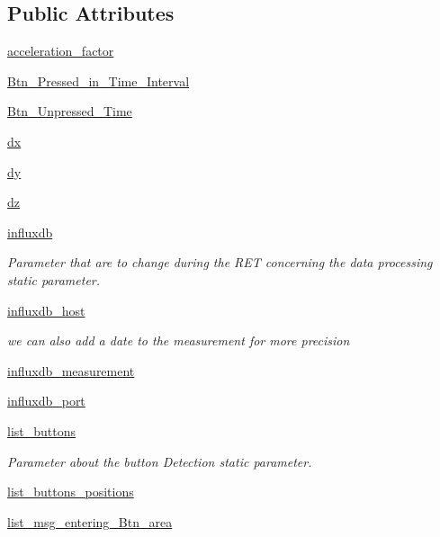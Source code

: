 \subsection*{Public Attributes}
\begin{DoxyCompactItemize}
\item 
\hyperlink{a00037_abd224cfc80b136898df89af7812fa8d5}{acceleration\+\_\+factor}
\item 
\hyperlink{a00037_a73222c92f422e37740aa524320dd3b66}{Btn\+\_\+\+Pressed\+\_\+in\+\_\+\+Time\+\_\+\+Interval}
\item 
\hyperlink{a00037_a7863230eddd33d64211a89a31cecb827}{Btn\+\_\+\+Unpressed\+\_\+\+Time}
\item 
\hyperlink{a00037_aacddc911cdfe5cd5ec97b084754542d4}{dx}
\item 
\hyperlink{a00037_a22b1a06ae09d552a5ca668a07885ebf1}{dy}
\item 
\hyperlink{a00037_a71f0caccd6959b358543ee9cdc9b9c3e}{dz}
\item 
\hyperlink{a00037_a034f595b48aad7217bd228d3620eaca8}{influxdb}
\begin{DoxyCompactList}\small\item\em Parameter that are to change during the R\+ET concerning the data processing static parameter. \end{DoxyCompactList}\item 
\hyperlink{a00037_a2c910a8a000ce837b18cf2959297dcce}{influxdb\+\_\+host}
\begin{DoxyCompactList}\small\item\em we can also add a date to the measurement for more precision \end{DoxyCompactList}\item 
\hyperlink{a00037_a2951333e048b79a878571eafd1eee541}{influxdb\+\_\+measurement}
\item 
\hyperlink{a00037_a0d892e15d9fa78818d4495560d962ec2}{influxdb\+\_\+port}
\item 
\hyperlink{a00037_a50ea04db981a8afa82086a60a58ae466}{list\+\_\+buttons}
\begin{DoxyCompactList}\small\item\em Parameter about the button Detection static parameter. \end{DoxyCompactList}\item 
\hyperlink{a00037_ae07c53483c9c3ff8611ec4d7401fa71f}{list\+\_\+buttons\+\_\+positions}
\item 
\hyperlink{a00037_a1d89a275c67888d70d61831fede7b2c1}{list\+\_\+msg\+\_\+entering\+\_\+\+Btn\+\_\+area}

\end{DoxyCompactItemize}
